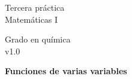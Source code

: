 \documentclass{article}
\title{\tit}
\author{}
\date{}
\def\tit{Funciones de varias variables}
\begin{document}
\noindent\begin{minipage}{.4\textwidth}
\large
Tercera práctica\\
Matemáticas I
\end{minipage}
\hfill
\begin{minipage}{.4\textwidth}
\large
\flushright
Grado en química\\
v1.0
\end{minipage}

\bigskip

\begin{center}
\textbf{
\huge
\tit
}
\end{center}


\end{document}
